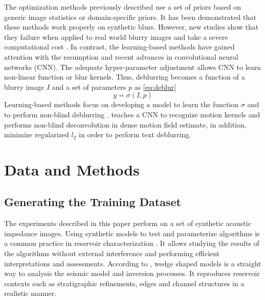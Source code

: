 \documentclass[conference]{IEEEtran}
\begin{document}
The optimization methods previously described use a set of priors based on
generic image statistics or domain-specific priors. It has been demonstrated
that these methods work properly on synthetic blurs. However, new studies show that they failure
when applied to real world blurry images \cite{Lai2016} and take a severe computational cost \cite{Chakrabarti2016}.
In contrast, the learning-based methods have gained attention with the resumption and recent advances in convolutional neural
networks (CNN). The adequate hyper-parameter adjustment allows CNN to learn
non-linear function or blur kernels. Thus, deblurring becomes a function of a blurry image $I$
and a set of parameters $p$ as \eqref{eq:deblur}
\begin{equation}
 y = \sigma(I,p)
 \label{eq:deblur}
\end{equation}
Learning-based methods focus on developing a model to learn the function $\sigma$ \cite{Hradis2015}
and to perform non-blind deblurring \cite{Chakrabarti2016}. \cite{Sun2015} teaches a CNN to
recognize motion kernels and performs non-blind deconvolution in
dense motion field estimate, in addition, \cite{Hradis2015} minimize regularized $l_2$ 
in order to perform text deblurring.

\section{Data and Methods} \label{DMsection}
\subsection{Generating the Training Dataset}
The experiments described in this paper perform
on a set of synthetic acoustic impedance images. Using synthetic models
to test and parameterize algorithms is a common practice in reservoir characterization \cite{Sergio2016}. It allows studying the
results of the algorithms without external interference and performing efficient interpretations and assessments. 
According to \cite{Harvey}, wedge shaped models is a straight way to analysis the
seismic model and inversion processes. It reproduces
reservoir contexts such as stratigraphic refinements, edges and channel structures in a realistic manner.
\end{document}
